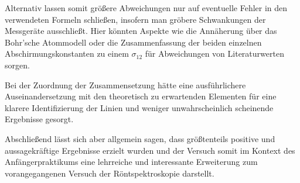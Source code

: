 \documentclass{article}
\begin{document}
Alternativ lassen somit größere Abweichungen nur auf eventuelle Fehler in den verwendeten Formeln schließen, insofern man gröbere Schwankungen der Messgeräte ausschließt. Hier könnten Aspekte wie die Annäherung über das Bohr'sche Atommodell oder die Zusammenfassung der beiden einzelnen Abschirmungskonstanten zu einem $\sigma_{12}$ für Abweichungen von Literaturwerten sorgen.

Bei der Zuordnung der Zusammensetzung hätte eine ausführlichere Auseinandersetzung mit den theoretisch zu erwartenden Elementen für eine klarere Identifizierung der Linien und weniger unwahrscheinlich scheinende Ergebnisse gesorgt.   

Abschließend lässt sich aber allgemein sagen, dass größtenteils positive und aussagekräftige Ergebnisse erzielt wurden und der Versuch somit im Kontext des Anfängerpraktikums eine lehrreiche und interessante Erweiterung zum vorangegangenen Versuch der Röntspektroskopie darstellt. 


\newpage

\end{document}
